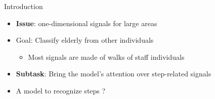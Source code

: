 \documentclass[8pt,t,aspectratio=1610]{beamer}
\begin{document}
\begin{frame}{Introduction}{}
\begin{itemize}
    \item \textbf{Issue}: one-dimensional signals for large areas
    \item Goal: Classify elderly from other individuals
    \begin{itemize}
        \item Most signals are made of walks of staff individuals
    \end{itemize}
    \item \textbf{Subtask}: Bring the model's attention over step-related signals
\end{itemize}
\begin{itemize}
    \item A model to recognize steps ?
\end{itemize}


\end{frame}
\end{document}
